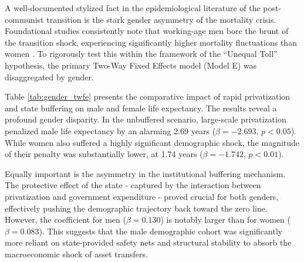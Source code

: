 \documentclass[en,magisterska]{pracamgr}
\begin{document}
A well-documented stylized fact in the epidemiological literature of the post-communist transition is the stark gender asymmetry of the mortality crisis. Foundational studies consistently note 
that working-age men bore the brunt of the transition shock, experiencing significantly higher mortality fluctuations than women \citep{B_Brainerd1998, Stuckler2009}. To rigorously test this within 
the framework of the ``Unequal Toll'' hypothesis, the primary Two-Way Fixed Effects model (Model E) was disaggregated by gender.

Table \ref{tab:gender_twfe} presents the comparative impact of rapid privatization and state buffering on male and female life expectancy. The results reveal a profound gender disparity. In the 
unbuffered scenario, large-scale privatization penalized male life expectancy by an alarming 2.69 years ($\beta = -2.693$, $p < 0.05$). While women also suffered a highly significant demographic 
shock, the magnitude of their penalty was substantially lower, at 1.74 years ($\beta = -1.742$, $p < 0.01$). 

Equally important is the asymmetry in the institutional buffering mechanism. The protective effect of the state  -  captured by the interaction between privatization and government expenditure  -  proved 
crucial for both genders, effectively pushing the demographic trajectory back toward the zero line. However, the coefficient for men ($\beta = 0.130$) is notably larger than for women ($\beta = 0.083$). 
This suggests that the male demographic cohort was significantly more reliant on state-provided safety nets and structural stability to absorb the macroeconomic shock of asset transfers.
\end{document}
